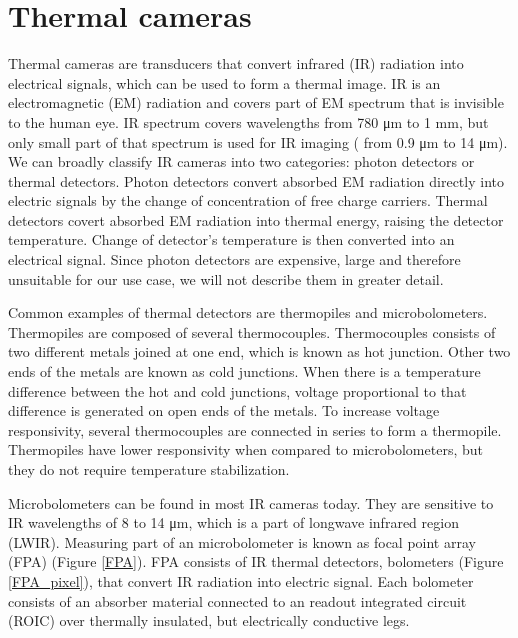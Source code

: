 \section{ Thermal cameras}

Thermal cameras are transducers that convert infrared (IR) radiation into electrical signals, which can be used to form a thermal image.
IR is an electromagnetic (EM) radiation and covers part of EM spectrum that is invisible to the human eye.
IR spectrum covers wavelengths from 780 \si{\micro\meter} to 1 \si{\milli\meter}, but only small part of that spectrum is used for IR imaging ( from 0.9 \si{\micro\meter} to 14 \si{\micro\meter})\cite{thermal_book}.
We can broadly classify IR cameras into two categories: photon detectors or thermal detectors\cite{thermal_book}.
Photon detectors convert absorbed EM radiation directly into electric signals by the change of concentration of free charge carriers\cite{thermal_book}.
Thermal detectors covert absorbed EM radiation into thermal energy, raising the detector temperature\cite{thermal_book}. 
Change of detector's temperature is then converted into an electrical signal.
Since photon detectors are expensive, large and therefore unsuitable for our use case, we will not describe them in greater detail.

Common examples of thermal detectors are thermopiles and microbolometers. 
Thermopiles are composed of several thermocouples.
Thermocouples consists of two different metals joined at one end, which is known as hot junction.
Other two ends of the metals are known as cold junctions.
When there is a temperature difference between the hot and cold junctions, voltage proportional to that difference is generated on open ends of the metals.
To increase voltage responsivity, several thermocouples are connected in series to form a thermopile\cite{thermal_book}.
Thermopiles have lower responsivity when compared to microbolometers, but they do not require temperature stabilization\cite{thermal_book}.

Microbolometers can be found in most IR cameras today\cite{thermal_book}. 
They are sensitive to IR wavelengths of 8 to 14 \si{\micro\meter}, which is a part of longwave infrared region (LWIR)\cite{thermal_book}.
Measuring part of an microbolometer is known as focal point array (FPA) (Figure \ref{FPA}).
FPA consists of IR thermal detectors, bolometers (Figure \ref{FPA_pixel}), that convert IR radiation into electric signal.
Each bolometer consists of an absorber material connected to an readout integrated circuit (ROIC) over thermally insulated, but electrically conductive legs\cite{thermal_article}.
\newline

